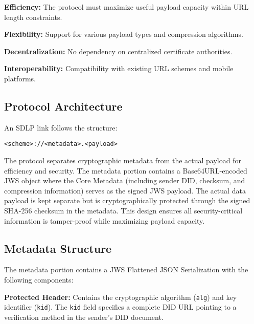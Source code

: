 \documentclass[conference]{IEEEtran}
\begin{document}
\textbf{Efficiency:} The protocol must maximize useful payload capacity within URL length constraints.

\textbf{Flexibility:} Support for various payload types and compression algorithms.

\textbf{Decentralization:} No dependency on centralized certificate authorities.

\textbf{Interoperability:} Compatibility with existing URL schemes and mobile platforms.

\subsection{Protocol Architecture}

An SDLP link follows the structure:
\begin{center}
\texttt{<scheme>://<metadata>.<payload>}
\end{center}

The protocol separates cryptographic metadata from the actual payload for efficiency and security. The metadata portion contains a Base64URL-encoded JWS object where the Core Metadata (including sender DID, checksum, and compression information) serves as the signed JWS payload. The actual data payload is kept separate but is cryptographically protected through the signed SHA-256 checksum in the metadata. This design ensures all security-critical information is tamper-proof while maximizing payload capacity.


\subsection{Metadata Structure}

The metadata portion contains a JWS Flattened JSON Serialization with the following components:

\textbf{Protected Header:} Contains the cryptographic algorithm (\texttt{alg}) and key identifier (\texttt{kid}). The \texttt{kid} field specifies a complete DID URL pointing to a verification method in the sender's DID document.
\end{document}
